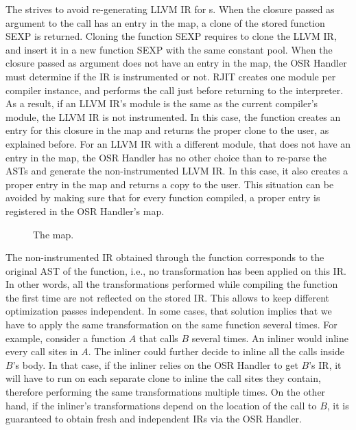 The  strives to avoid re-generating LLVM IR for s.
When the closure passed as argument to the  call has an entry in the  map, a clone of the stored function SEXP is returned.
Cloning the function SEXP requires to clone the LLVM IR, and insert it in a new function SEXP with the same constant pool.
When the closure passed as argument does not have an entry in the  map, the OSR Handler must determine if the IR is instrumented or not.
RJIT creates one module per compiler instance, and performs the  call just before returning to the interpreter.
As a result, if an LLVM IR's module is the same as the current compiler's module, the LLVM IR is not instrumented.
In this case, the  function creates an entry for this closure in the  map and returns the proper clone to the user, as explained before.
For an LLVM IR with a different module, that does not have an entry in the map, the OSR Handler has no other choice than to re-parse the ASTs and generate the non-instrumented LLVM IR.
In this case, it also creates a proper entry in the  map and returns a copy to the user.
This situation can be avoided by making sure that for every function compiled, a proper entry is registered in the OSR Handler's  map.\\

\begin{figure}[h]
\caption{The  map.}
\label{fig:baseversionmap}
\end{figure}

The non-instrumented IR obtained through the  function corresponds to the original AST of the function, i.e., no transformation has been applied on this IR. 
In other words, all the transformations performed while compiling the function the first time are not reflected on the stored IR. 
This allows to keep different optimization passes independent.
In some cases, that solution implies that we have to apply the same transformation on the same function several times.
For example, consider a function $A$ that calls $B$ several times.
An inliner would inline every call sites in $A$.
The inliner could further decide to inline all the calls inside $B$'s body.
In that case, if the inliner relies on the OSR Handler to get $B$'s IR, it will have to run on each separate clone to inline the call sites they contain, therefore performing the same transformations multiple times.
On the other hand, if the inliner's transformations depend on the location of the call to $B$, it is guaranteed to obtain fresh and independent IRs via the OSR Handler.\\

